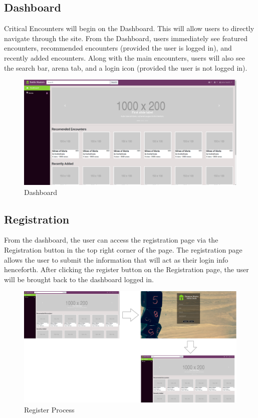 \documentclass[12pt,a4paper]{report}
\begin{document}
		\subsection{Dashboard}
		Critical Encounters will begin on the Dashboard. This will allow users to directly navigate through the site. From the Dashboard, users immediately see featured encounters, recommended encounters (provided the user is logged in), and recently added encounters. Along with the main encounters, users will also see the search bar, arena tab, and a login icon (provided the user is not logged in).
		\begin{figure}[H]
			\centering
			\centerline{\includegraphics[scale=.2]{home}}
			\caption{Dashboard}
			\label{fig: Dashboard}
		\end{figure}
		\newpage
		\subsection{Registration}
		From the dashboard, the user can access the registration page via the Registration button in the top right corner of the page. The registration page allows the user to submit the information that will act as their login info henceforth. After clicking the register button on the Registration page, the user will be brought back to the dashboard logged in.
		\begin{figure}[H]
			\centering
			\centerline{\includegraphics[scale=.10]{registerNav}}
			\caption{Register Process}
			\label{fig: Register Page}
		\end{figure}
\end{document}
